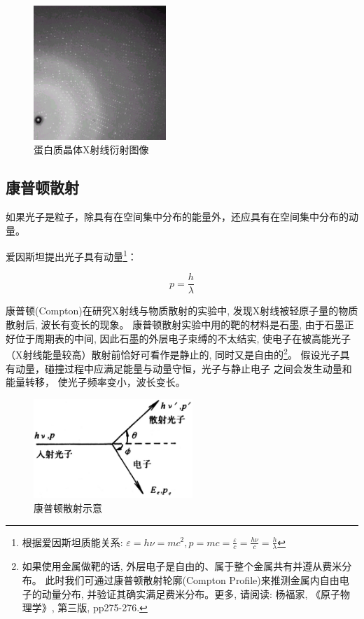 \begin{figure}[h]
\begin{center}
\includegraphics[width=5cm]{Duality/xray.ps}
\caption{蛋白质晶体X射线衍射图像}
\end{center}
\end{figure}


\subsection{康普顿散射}

如果光子是粒子，除具有在空间集中分布的能量外，还应具有在空间集中分布的动量。

爱因斯坦提出光子具有动量\footnote{根据爱因斯坦质能关系: $\varepsilon
= h\nu  = mc^2 ,p = mc = \frac{\varepsilon }{c} = \frac{{h\nu }}{c}
= \frac{h}{\lambda }$}：

\begin{equation}\label{Einstein momentum of photon}
    p = \frac{h}{\lambda }
\end{equation}



康普顿(Compton)在研究X射线与物质散射的实验中,
发现X射线被轻原子量的物质散射后, 波长有变长的现象。
康普顿散射实验中用的靶的材料是石墨, 由于石墨正好位于周期表的中间,
因此石墨的外层电子束缚的不太结实,
使电子在被高能光子（X射线能量较高）散射前恰好可看作是静止的,
同时又是自由的\footnote{如果使用金属做靶的话,
外层电子是自由的、属于整个金属共有并遵从费米分布。
此时我们可通过康普顿散射轮廓(Compton
Profile)来推测金属内自由电子的动量分布,
并验证其确实满足费米分布。更多, 请阅读: 杨福家, 《原子物理学》,
第三版, pp275-276.}。
假设光子具有动量，碰撞过程中应满足能量与动量守恒，光子与静止电子
之间会发生动量和能量转移， 使光子频率变小，波长变长。

\begin{figure}[h]
\begin{center}
\includegraphics[width=6cm]{Duality/3-5.ps}
\caption{康普顿散射示意}
\end{center}
\end{figure}

